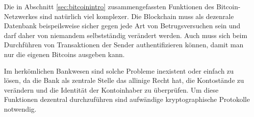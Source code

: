 Die in Abschnitt \ref{sec:bitcoinintro} zusammengefassten Funktionen des Bitcoin-Netzwerkes sind natürlich viel komplexer.
Die Blockchain muss als dezenrale Datenbank beispeilsweise sicher gegen jede Art von Betrugsversuchen sein und darf daher von niemandem selbstständig verändert werden.
Auch muss sich beim Durchführen von Transaktionen der Sender authentifizieren können, damit man nur die eigenen Bitcoins ausgeben kann.

Im herkömlichen Bankwesen sind solche Probleme inexistent oder einfach zu lösen, da die Bank als zentrale Stelle das allinige Recht hat, die Kontostände zu verändern und die Identität der Kontoinhaber zu überprüfen.
Um diese Funktionen dezentral durchzuführen sind aufwändige kryptographische Protokolle notwendig.
